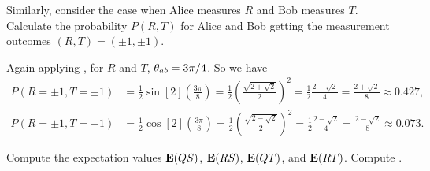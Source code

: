 \newcommand{\kRp}{\ket{R_+}}
\newcommand{\kRm}{\ket{R_-}}
\newcommand{\kSp}{\ket{S_+}}
\newcommand{\kSm}{\ket{S_-}}

\begin{problem}
	Similarly, consider the case when Alice measures $R$ and Bob measures $T$.  Calculate the probability $P(R, T)$ for Alice and Bob getting the measurement outcomes $(R, T) = (\pm1, \pm1)$.
\end{problem}

\begin{solution}
	Again applying , for $R$ and $T$, $\theta_{ab} = 3\pi / 4$.  So we have
	\begin{align*}
		P(R=\pm1, T=\pm1) &= \frac{1}{2} \sin[2](\frac{3\pi}{8})
		= \frac{1}{2} \left( \frac{\sqrt{2 + \sqrt{2}}}{2} \right)^2
		= \frac{1}{2} \frac{2 + \sqrt{2}}{4}
		= \frac{2 + \sqrt{2}}{8}
		\approx 0.427, \\
		P(R=\pm1, T=\mp1) &= \frac{1}{2} \cos[2](\frac{3\pi}{8})
		= \frac{1}{2} \left( \frac{\sqrt{2 - \sqrt{2}}}{2} \right)^2
		= \frac{1}{2} \frac{2 - \sqrt{2}}{4}
		= \frac{2 - \sqrt{2}}{8}
		\approx 0.073.
	\end{align*}
	\vfix
\end{solution}



\begin{problem}
	Compute the expectation values $\vb{E}(QS)$, $\vb{E}(RS)$, $\vb{E}(QT)$, and $\vb{E}(RT)$.  Compute
	\beq
		.
	\eeq
	\vfix
\end{problem}

